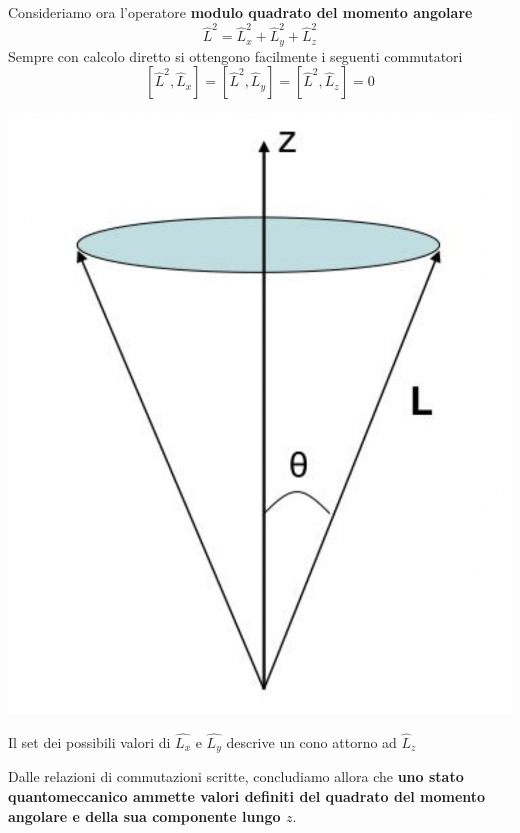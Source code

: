 Consideriamo ora l'operatore \textbf{modulo quadrato del momento
	angolare} \[
	\hat{L}^{2} = \hat{L}_{x}^{2} + \hat{L}_{y}^{2} + \hat{L}_{z}^{2}
\] Sempre con calcolo diretto si ottengono facilmente i seguenti
commutatori \[
	\left[ \hat{L}^{2},\hat{L}_{x}\right] = \left[ \hat{L}^{2},\hat{L}_{y}\right] = \left[ \hat{L}^{2},\hat{L}_{z}\right] = 0
\]
\begin{marginfigure}
	\includegraphics{figs/ang-mom-cone}
	\caption{Il set dei possibili valori di $\hat{L_x}$ e $\hat{L_y}$ descrive un cono attorno ad $\hat{L}_z$}
	\label{fig:ang-mom-cone}
\end{marginfigure}


Dalle relazioni di commutazioni scritte, concludiamo allora che
\textbf{uno stato quantomeccanico ammette valori definiti del quadrato
	del momento angolare e della sua componente lungo \(z\)}.

